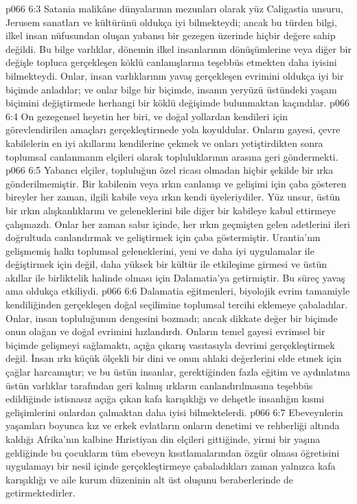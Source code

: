 \vs p066 6:3 Satania malikâne dünyalarının mezunları olarak yüz Caligastia unsuru, Jerusem sanatları ve kültürünü oldukça iyi bilmekteydi; ancak bu türden bilgi, ilkel insan nüfusundan oluşan yabansı bir gezegen üzerinde hiçbir değere sahip değildi. Bu bilge varlıklar, dönemin ilkel insanlarının  dönüşümlerine veya diğer bir değişle topluca gerçekleşen köklü canlanışlarına teşebbüs etmekten daha iyisini bilmekteydi. Onlar, insan varlıklarının yavaş gerçekleşen evrimini oldukça iyi bir biçimde anladılar; ve onlar bilge bir biçimde, insanın yeryüzü üstündeki yaşam biçimini değiştirmede herhangi bir köklü değişimde bulunmaktan kaçındılar.
\vs p066 6:4 On gezegensel heyetin her biri,  ve doğal yollardan kendileri için görevlendirilen amaçları gerçekleştirmede yola koyuldular. Onların gayesi, çevre kabilelerin en iyi akıllarını kendilerine çekmek ve onları yetiştirdikten sonra toplumsal canlanmanın elçileri olarak topluluklarının arasına geri göndermekti.
\vs p066 6:5 Yabancı elçiler, topluluğun özel ricası olmadan hiçbir şekilde bir ırka gönderilmemiştir. Bir kabilenin veya ırkın canlanışı ve gelişimi için çaba gösteren bireyler her zaman, ilgili kabile veya ırkın kendi üyeleriydiler. Yüz unsur, üstün bir ırkın alışkanlıklarını ve geleneklerini bile diğer bir kabileye kabul ettirmeye çalışmazdı. Onlar her zaman sabır içinde, her ırkın geçmişten gelen adetlerini ileri doğrultuda canlandırmak ve geliştirmek için çaba göstermiştir. Urantia’nın gelişmemiş halkı toplumsal geleneklerini, yeni ve daha iyi uygulamalar ile değiştirmek için değil, daha yüksek bir kültür ile etkileşime girmesi ve üstün akıllar ile birliktelik halinde olması için Dalamatia’ya getirmiştir. Bu süreç yavaş ama oldukça etkiliydi.
\vs p066 6:6 Dalamatia eğitmenleri, biyolojik evrim tamamiyle kendiliğinden gerçekleşen doğal seçilimine toplumsal tercihi eklemeye çabaladılar. Onlar, insan topluluğunun dengesini bozmadı; ancak dikkate değer bir biçimde onun olağan ve doğal evrimini hızlandırdı. Onların temel gayesi evrimsel bir biçimde gelişmeyi sağlamaktı, açığa çıkarış vasıtasıyla devrimi gerçekleştirmek değil. İnsan ırkı küçük ölçekli bir dini ve onun ahlaki değerlerini elde etmek için çağlar harcamıştır; ve bu üstün insanlar, gerektiğinden fazla eğitim ve aydınlatma üstün varlıklar tarafından geri kalmış ırkların canlandırılmasına teşebbüs edildiğinde istisnasız açığa çıkan kafa karışıklığı ve dehşetle insanlığın kısmi gelişimlerini onlardan çalmaktan daha iyisi bilmektelerdi.
\vs p066 6:7 Ebeveynlerin yaşamları boyunca kız ve erkek evlatların onların denetimi ve rehberliği altında kaldığı Afrika’nın kalbine Hıristiyan din elçileri gittiğinde, yirmi bir yaşına geldiğinde bu çocukların tüm ebeveyn kısıtlamalarından özgür olması öğretisini uygulamayı bir nesil içinde gerçekleştirmeye çabaladıkları zaman yalnızca kafa karışıklığı ve aile kurum düzeninin alt üst oluşunu beraberlerinde de getirmektedirler.
